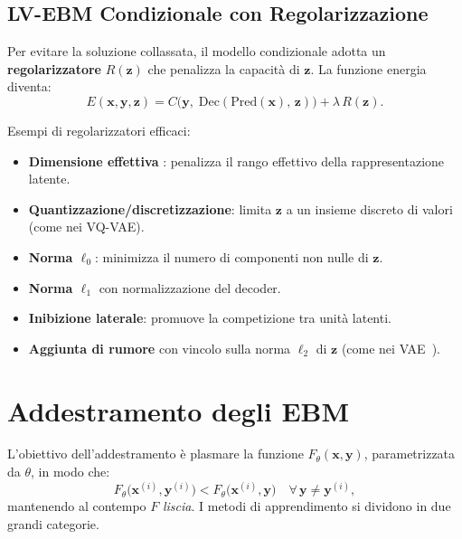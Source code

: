 \subsection{LV-EBM Condizionale con Regolarizzazione}
\label{subsec:conditional-lv-ebm}

Per evitare la soluzione collassata, il modello condizionale adotta un
\textbf{regolarizzatore} $R(\mathbf{z})$ che penalizza la capacità di
$\mathbf{z}$. La funzione energia diventa:
\begin{equation}
  E(\mathbf{x}, \mathbf{y}, \mathbf{z})
  = C\!\bigl(\mathbf{y},\; \text{Dec}(\text{Pred}(\mathbf{x}),\, \mathbf{z})\bigr)
  + \lambda\, R(\mathbf{z}).
  \label{eq:conditional-lv-ebm}
\end{equation}

Esempi di regolarizzatori efficaci:
\begin{itemize}
  \item \textbf{Dimensione effettiva} \citep{li2020rethinking}: penalizza
        il rango effettivo della rappresentazione latente.
  \item \textbf{Quantizzazione/discretizzazione}: limita $\mathbf{z}$ a
        un insieme discreto di valori (come nei VQ-VAE).
  \item \textbf{Norma $\ell_0$}: minimizza il numero di componenti non nulle
        di $\mathbf{z}$.
  \item \textbf{Norma $\ell_1$} con normalizzazione del decoder.
  \item \textbf{Inibizione laterale}: promuove la competizione tra unità
        latenti.
  \item \textbf{Aggiunta di rumore} con vincolo sulla norma $\ell_2$
        di $\mathbf{z}$ (come nei VAE~\citep{kingma2013vae}).
\end{itemize}

\section{Addestramento degli EBM}
\label{sec:ebm-training}

L'obiettivo dell'addestramento è plasmare la funzione
$F_\theta(\mathbf{x},\mathbf{y})$, parametrizzata da $\theta$, in modo
che:
\begin{equation}
  F_\theta\!\bigl(\mathbf{x}^{(i)}, \mathbf{y}^{(i)}\bigr)
  <
  F_\theta\!\bigl(\mathbf{x}^{(i)}, \mathbf{y}\bigr)
  \quad \forall\, \mathbf{y} \neq \mathbf{y}^{(i)},
\end{equation}
mantenendo al contempo $F$ \emph{liscia}. I metodi di apprendimento si
dividono in due grandi categorie.

